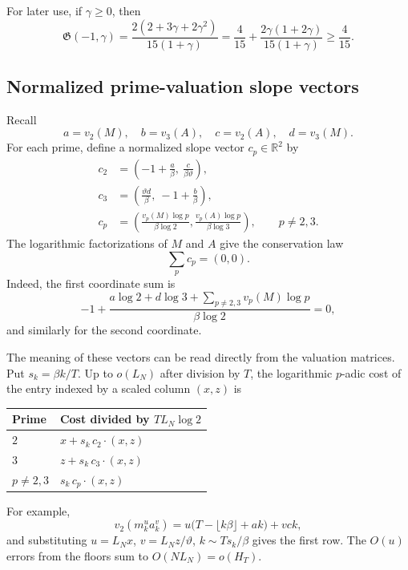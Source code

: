 \documentclass[11pt,oneside]{article}
\theoremstyle{definition}
\theoremstyle{remark}
\newcommand{\R}{\mathbb R}
\begin{document}
For later use, if $\gamma\ge0$, then
\begin{equation}\label{eq:G-minus1gamma}
 \mathfrak G(-1,\gamma)
 =\frac{2(2+3\gamma+2\gamma^2)}{15(1+\gamma)}
 =\frac4{15}+\frac{2\gamma(1+2\gamma)}{15(1+\gamma)}
 \ge\frac4{15}.
\end{equation}

\subsection{Normalized prime-valuation slope vectors}

Recall
\[
 a=v_2(M),\quad b=v_3(A),\quad c=v_2(A),\quad d=v_3(M).
\]
For each prime, define a normalized slope vector $c_p\in\R^2$ by
\begin{align}
 c_2&=\left(-1+\frac a\beta,\ \frac{c}{\beta\vartheta}\right),
 \label{eq:c2}\\
 c_3&=\left(\frac{\vartheta d}{\beta},\ -1+\frac b\beta\right),
 \label{eq:c3}\\
 c_p&=\left(
  \frac{v_p(M)\log p}{\beta\log2},
  \frac{v_p(A)\log p}{\beta\log3}
 \right),\qquad p\ne2,3.
 \label{eq:cp-external}
\end{align}
The logarithmic factorizations of $M$ and $A$ give the conservation law
\begin{equation}\label{eq:slope-conservation}
  \sum_p c_p=(0,0).
\end{equation}
Indeed, the first coordinate sum is
\[
 -1+\frac{a\log2+d\log3+
   \sum_{p\ne2,3}v_p(M)\log p}{\beta\log2}=0,
\]
and similarly for the second coordinate.

The meaning of these vectors can be read directly from the valuation matrices.  Put
$s_k=\beta k/T$.  Up to $o(L_N)$ after division by $T$, the logarithmic $p$-adic cost of the
entry indexed by a scaled column $(x,z)$ is
\begin{center}
\begin{tabular}{@{}ll@{}}
\toprule
Prime & Cost divided by $T L_N\log2$\\
\midrule
$2$ & $x+s_k\,c_2\mathbin{\cdot}(x,z)$\\
$3$ & $z+s_k\,c_3\mathbin{\cdot}(x,z)$\\
$p\ne2,3$ & $s_k\,c_p\mathbin{\cdot}(x,z)$\\
\bottomrule
\end{tabular}
\end{center}
For example,
\[
 v_2(m_k^ua_k^v)=u\bigl(T-\lfloor k\beta\rfloor+ak\bigr)+vck,
\]
and substituting $u=L_Nx$, $v=L_Nz/\vartheta$, $k\sim Ts_k/\beta$ gives the first row.
The $O(u)$ errors from the floors sum to $O(NL_N)=o(H_T)$.
\end{document}
